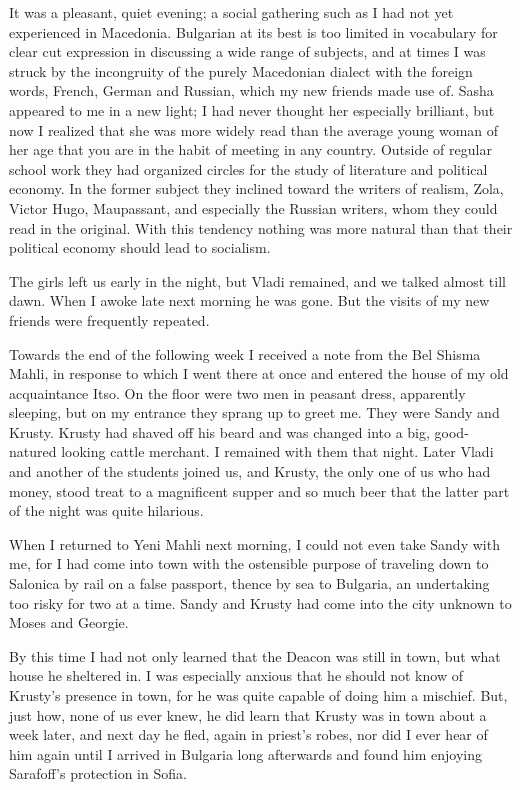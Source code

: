 \documentclass[a5paper,12pt]{book}
\begin{document}
It was a pleasant, quiet evening; a social gathering such as I had not yet experienced in Macedonia. Bulgarian at its best is too limited in vocabulary for clear cut expression in discussing a wide range of subjects, and at times I was struck by the incongruity of the purely Macedonian dialect with the foreign words, French, German and Russian, which my new friends made use of. Sasha appeared to me in a new light; I had never thought her especially brilliant, but now I realized that she was more widely read than the average young woman of her age that you are in the habit of meeting in any country. Outside of regular school work they had organized circles for the study of literature and political economy. In the former subject they inclined toward the writers of realism, Zola, Victor Hugo, Maupassant, and especially the Russian writers, whom they could read in the original. With this tendency nothing was more natural than that their political economy should lead to socialism.

The girls left us early in the night, but Vladi remained, and we talked almost till dawn. When I awoke late next morning he was gone. But the visits of my new friends were frequently repeated.

Towards the end of the following week I received a note from the Bel Shisma Mahli, in response to which I went there at once and entered the house of my old acquaintance Itso. On the floor were two men in peasant dress, apparently sleeping, but on my entrance they sprang up to greet me. They were Sandy and Krusty. Krusty had shaved off his beard and was changed into a big, good-natured looking cattle merchant. I remained with them that night. Later Vladi and another of the students joined us, and Krusty, the only one of us who had money, stood treat to a magnificent supper and so much beer that the latter part of the night was quite hilarious.

When I returned to Yeni Mahli next morning, I could not even take Sandy with me, for I had come into town with the ostensible purpose of traveling down to Salonica by rail on a false passport, thence by sea to Bulgaria, an undertaking too risky for two at a time. Sandy and Krusty had come into the city unknown to Moses and Georgie.

By this time I had not only learned that the Deacon was still in town, but what house he sheltered in. I was especially anxious that he should not know of Krusty’s presence in town, for he was quite capable of doing him a mischief. But, just how, none of us ever knew, he did learn that Krusty was in town about a week later, and next day he fled, again in priest’s robes, nor did I ever hear of him again until I arrived in Bulgaria long afterwards and found him enjoying Sarafoff's protection in Sofia.
\end{document}
